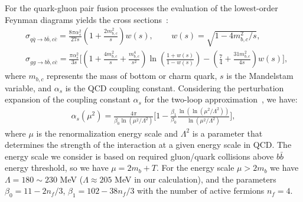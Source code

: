 For the quark-gluon pair fusion processes
the evaluation of the lowest-order Feynman diagrams yields the cross sections~\cite{Letessier:2002ony}:
\begin{align}
&\sigma_{q\bar{q}\rightarrow b\bar{b},c\bar{c}}=\frac{8\pi\alpha_s^2}{27s}\left(1+\frac{2m_{b,c}^2}{s}\right)w(s),\,\qquad w(s)=\sqrt{1-{4m^2_{b,c}}/{s}},\\
&\sigma_{gg\rightarrow b\bar{b},c\bar{c}}=\!\frac{\pi\alpha_s^2}{3s}\bigg[\left(1\!+\!\frac{4m^2_{b,c}}{s}\!+\!\frac{m^4_{b,c}}{s^2}\right)\ln{\left(\frac{1+w(s)}{1-w(s)}\right)}\!-\!\left(\frac{7}{4}\!+\!\frac{31m^2_{b,c}}{4s}\right)w(s)\bigg],
\end{align} 
where $m_{b,c}$ represents the mass of bottom or charm quark, $s$ is the Mandelstam variable, and $\alpha_s$ is the QCD coupling constant. Considering the perturbation expansion of the coupling constant $\alpha_s$ for the two-loop approximation~\cite{Letessier:2002ony}, we have:
\begin{align}
\alpha_s(\mu^2)=\frac{4\pi}{\beta_0\ln({\mu^2/\Lambda^2})}\bigg[1-\frac{\beta_1}{\beta_0}\frac{\ln(\ln{(\mu^2/\Lambda^2)})}{\ln(\mu^2/\Lambda^2)}\bigg],
\end{align}
where $\mu$ is the renormalization energy scale and $\Lambda^2$ is a parameter that determines the strength of the interaction at a given energy scale in QCD. The energy scale we consider is based on required gluon/quark collisions above $b\bar b$ energy threshold, so we have $\mu=2m_b+T$. For the energy scale $\mu>2m_b$ we have $\Lambda=180\sim230$ MeV ($\Lambda\approx205$ MeV in our calculation), and the parameters $\beta_0=11-2n_f/3$, $\beta_1=102-38n_f/3$ with the number of active fermions $n_f=4$. 

